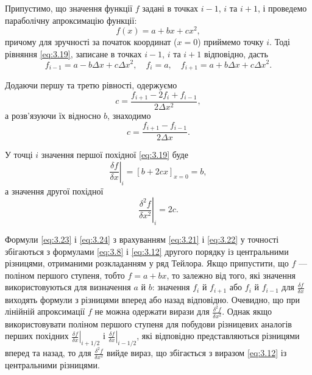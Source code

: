 Припустимо, що значення функції $f$ задані в точках $i - 1$, $i$ та $i + 1$, і проведемо параболічну апроксимацію функції:
\begin{equation}
    \label{eq:3.19}
    f(x) = a + b x + c x^2,
\end{equation}
причому для зручності за початок координат ($x = 0$) приймемо точку $i$. Тоді рівняння \eqref{eq:3.19}, записане в точках $i - 1$, $i$ та $i + 1$ відповідно, дасть
\begin{equation}
    \label{eq:3.20}
    f_{i - 1} = a - b \Delta x + c \Delta x^2, \quad f_i = a, \quad f_{i + 1} = a + b \Delta x + c \Delta x^2. 
\end{equation}

Додаючи першу та третю рівності, одержуємо
\begin{equation}
    \label{eq:3.21}
    c = \frac{f_{i + 1} - 2 f_i + f_{i - 1}}{2 \Delta x^2}, 
\end{equation}
а розв'язуючи їх відносно $b$, знаходимо
\begin{equation}
    \label{eq:3.22}
    c = \frac{f_{i + 1} - f_{i - 1}}{2 \Delta x}.
\end{equation}

У точці $i$ значення першої похідної \eqref{eq:3.19} буде
\begin{equation}
    \label{eq:3.23}
    \left. \frac{\delta f}{\delta x} \right|_i = [b + 2 c x]_{x = 0} = b,
\end{equation}
а значення другої похідної
\begin{equation}
    \label{eq:3.24}
    \left. \frac{\delta^2 f}{\delta x^2} \right|_i = 2 c.
\end{equation}

Формули \eqref{eq:3.23} і \eqref{eq:3.24} з врахуванням \eqref{eq:3.21} і \eqref{eq:3.22} у точності збігаються з формулами \eqref{eq:3.8} і \eqref{eq:3.12} другого порядку із центральними різницями, отриманими розкладанням у ряд Тейлора. Якщо припустити, що $f$ --- поліном першого ступеня, тобто $f = a + bx$, то залежно від того, які значення використовуються для визначення $a$ й $b$: значення $f_i$ й $f_{i + 1}$ або $f_i$ й $f_{i - 1}$ для $\frac{\delta f}{\delta x}$ виходять формули з різницями вперед або назад відповідно. Очевидно, що при лінійній апроксимації $f$ не можна одержати вирази для $\frac{\delta^2 f}{\delta x^2}$. Однак якщо використовувати поліном першого ступеня для побудови різницевих аналогів перших похідних $\left. \frac{\delta f}{\delta x} \right|_{i + 1/2}$ і $\left. \frac{\delta f}{\delta x} \right|_{i - 1/2}$, які відповідно представляються різницями вперед та назад, то для $\frac{\delta^2 f}{\delta x^2}$ вийде вираз, що збігається з виразом \eqref{eq:3.12} із центральними різницями. \medskip

